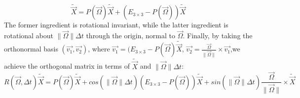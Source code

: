 \documentclass[12pt]{article}
\begin{document}
\begin{equation}
\tilde{\vec{X}}=P(\vec{\Omega})\tilde{\vec{X}}+(E_{3\times3}-P(\vec{\Omega}))\tilde{\vec{X}}
\end{equation}
The former ingredient is rotational invariant, while the latter ingredient is rotational about $\lVert{\vec{\Omega}}\rVert\Delta{t}$ through the origin, normal to $\vec{\Omega}$.
Finally, by taking the orthonormal basis $(\vec{v_1},\vec{v_2})$, where $\vec{v_1}=(E_{3\times3}-P(\vec{\Omega})\tilde{\vec{X}}$, $\vec{v_2}=\frac{\vec{\Omega}}{\lVert{\vec{\Omega}}\rVert}\times\vec{v_1}$,we achieve the orthogonal matrix in terms of $\tilde{\vec{X}}$ and $\lVert{\vec{\Omega}}\rVert\Delta{t}$:\\
\begin{equation}
R(\vec{\Omega},\Delta{t})\tilde{\vec{X}}=P(\vec{\Omega})\tilde{\vec{X}}+cos(\lVert{\vec{\Omega}}\rVert\Delta{t})(E_{3\times3}-P(\vec{\Omega}))\tilde{\vec{X}}+sin(\lVert{\vec{\Omega}}\rVert\Delta{t})\frac{\vec{\Omega}}{\lVert{\vec{\Omega}}\rVert}\times\tilde{\vec{X}}
\end{equation}
\end{document}
